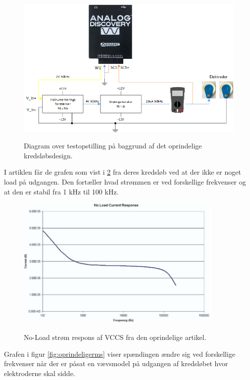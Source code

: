\begin{figure}[H]
\centering
{\includegraphics[width=\linewidth]
{Figure/testopstilling11}}
\caption{Diagram over testopstilling  på baggrund af det oprindelige kredsløbsdesign.}
\label{fig:testopstilling1}
\end{figure}

I artiklen får de grafen som vist i \ref{fig:oprindeligeonload} fra deres kredsløb ved at der ikke er noget load på udgangen. Den fortæller hvad strømmen er ved forskellige frekvenser og at den er stabil fra 1 kHz til 100 kHz. 

\begin{figure}[H]
\centering
{\includegraphics[width=10cm]
{Figure/oprindeligenoload}}
\caption{No-Load strøm respons af VCCS fra den oprindelige artikel\cite{Aroom2009}.}
\label{fig:oprindeligeonload}
\end{figure}

Grafen i figur \ref{fig:oprindeligerms} viser spændingen ændre sig ved forskellige frekvenser når der er påsat en vævsmodel på udgangen af kredsløbet hvor elektroderne skal sidde. 


